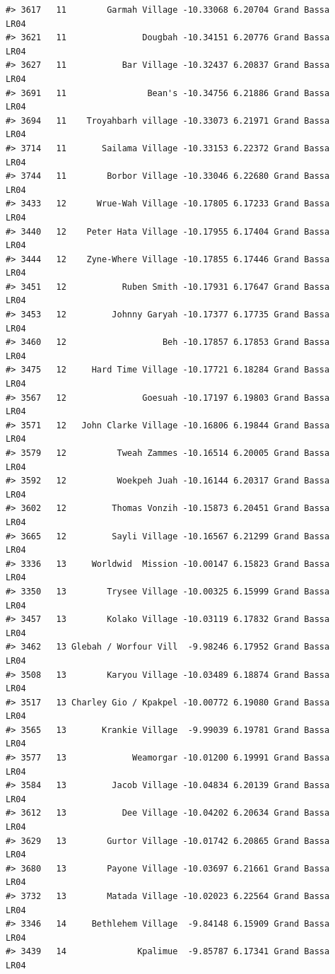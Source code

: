 \documentclass[12pt,a4paper]{book}
\theoremstyle{definition}
\theoremstyle{definition}
\theoremstyle{definition}
\theoremstyle{remark}
\begin{document}
\begin{verbatim}
#> 3617   11        Garmah Village -10.33068 6.20704 Grand Bassa       LR04
#> 3621   11               Dougbah -10.34151 6.20776 Grand Bassa       LR04
#> 3627   11           Bar Village -10.32437 6.20837 Grand Bassa       LR04
#> 3691   11                Bean's -10.34756 6.21886 Grand Bassa       LR04
#> 3694   11    Troyahbarh village -10.33073 6.21971 Grand Bassa       LR04
#> 3714   11       Sailama Village -10.33153 6.22372 Grand Bassa       LR04
#> 3744   11        Borbor Village -10.33046 6.22680 Grand Bassa       LR04
#> 3433   12      Wrue-Wah Village -10.17805 6.17233 Grand Bassa       LR04
#> 3440   12    Peter Hata Village -10.17955 6.17404 Grand Bassa       LR04
#> 3444   12    Zyne-Where Village -10.17855 6.17446 Grand Bassa       LR04
#> 3451   12           Ruben Smith -10.17931 6.17647 Grand Bassa       LR04
#> 3453   12         Johnny Garyah -10.17377 6.17735 Grand Bassa       LR04
#> 3460   12                   Beh -10.17857 6.17853 Grand Bassa       LR04
#> 3475   12     Hard Time Village -10.17721 6.18284 Grand Bassa       LR04
#> 3567   12               Goesuah -10.17197 6.19803 Grand Bassa       LR04
#> 3571   12   John Clarke Village -10.16806 6.19844 Grand Bassa       LR04
#> 3579   12          Tweah Zammes -10.16514 6.20005 Grand Bassa       LR04
#> 3592   12          Woekpeh Juah -10.16144 6.20317 Grand Bassa       LR04
#> 3602   12         Thomas Vonzih -10.15873 6.20451 Grand Bassa       LR04
#> 3665   12         Sayli Village -10.16567 6.21299 Grand Bassa       LR04
#> 3336   13     Worldwid  Mission -10.00147 6.15823 Grand Bassa       LR04
#> 3350   13        Trysee Village -10.00325 6.15999 Grand Bassa       LR04
#> 3457   13        Kolako Village -10.03119 6.17832 Grand Bassa       LR04
#> 3462   13 Glebah / Worfour Vill  -9.98246 6.17952 Grand Bassa       LR04
#> 3508   13        Karyou Village -10.03489 6.18874 Grand Bassa       LR04
#> 3517   13 Charley Gio / Kpakpel -10.00772 6.19080 Grand Bassa       LR04
#> 3565   13       Krankie Village  -9.99039 6.19781 Grand Bassa       LR04
#> 3577   13             Weamorgar -10.01200 6.19991 Grand Bassa       LR04
#> 3584   13         Jacob Village -10.04834 6.20139 Grand Bassa       LR04
#> 3612   13           Dee Village -10.04202 6.20634 Grand Bassa       LR04
#> 3629   13        Gurtor Village -10.01742 6.20865 Grand Bassa       LR04
#> 3680   13        Payone Village -10.03697 6.21661 Grand Bassa       LR04
#> 3732   13        Matada Village -10.02023 6.22564 Grand Bassa       LR04
#> 3346   14     Bethlehem Village  -9.84148 6.15909 Grand Bassa       LR04
#> 3439   14              Kpalimue  -9.85787 6.17341 Grand Bassa       LR04

\end{verbatim}
\end{document}
